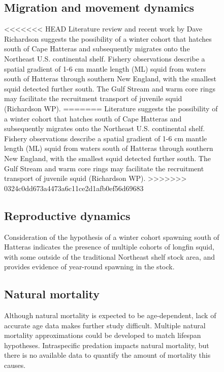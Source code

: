 \documentclass[
<<<<<<< HEAD
  8.5pt,
  letterpaper,
]{article}
\begin{document}
\begin{figure}
\begin{minipage}[t]{0.57\linewidth}
{\vspace{0.25cm}

\subsection{Migration and movement dynamics}

<<<<<<< HEAD
Literature review and recent work by Dave Richardson suggests the
possibility of a winter cohort that hatches south of Cape Hatteras and
subsequently migrates onto the Northeast U.S. continental shelf. Fishery
observations describe a spatial gradient of 1-6 cm mantle length (ML)
squid from waters south of Hatteras through southern New England, with
the smallest squid detected further south. The Gulf Stream and warm core
rings may facilitate the recruitment transport of juvenile squid
(Richardson WP).
=======
Literature suggests the possibility of a winter cohort that hatches
south of Cape Hatteras and subsequently migrates onto the Northeast U.S.
continental shelf. Fishery observations describe a spatial gradient of
1-6 cm mantle length (ML) squid from waters south of Hatteras through
southern New England, with the smallest squid detected further south.
The Gulf Stream and warm core rings may facilitate the recruitment
transport of juvenile squid (Richardson WP).
>>>>>>> 0324c0dd673a4473a6c11ce2d1afb0ef56d69683

\vspace{0.25cm}

\subsection{Reproductive dynamics}

Consideration of the hypothesis of a winter cohort spawning south of
Hatteras indicates the presence of multiple cohorts of longfin squid,
with some outside of the traditional Northeast shelf stock area, and
provides evidence of year-round spawning in the stock.

\vspace{0.25cm}

\subsection{Natural mortality}

Although natural mortality is expected to be age-dependent, lack of
accurate age data makes further study difficult. Multiple natural
mortality approximations could be developed to match lifespan
hypotheses. Intraspecific predation impacts natural mortality, but there
is no available data to quantify the amount of mortality this causes.

}
\end{minipage}
\end{figure}
\end{document}
